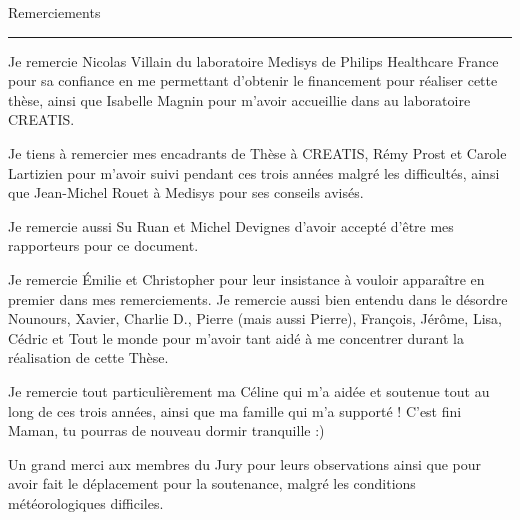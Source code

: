 {\fontsize{30}{100}\selectfont Remerciements}

\rule{15cm}{0.1em}

\vspace{1cm}

\thispagestyle{plain}

Je remercie Nicolas Villain du laboratoire Medisys de Philips Healthcare France pour sa confiance en me permettant d'obtenir le financement pour réaliser cette thèse, ainsi que Isabelle Magnin pour m'avoir accueillie dans au laboratoire CREATIS.

Je tiens à remercier mes encadrants de Thèse à CREATIS, Rémy Prost et Carole Lartizien pour m'avoir suivi pendant ces trois années malgré les difficultés, ainsi que Jean-Michel Rouet à Medisys pour ses conseils avisés.

Je remercie aussi Su Ruan et Michel Devignes d'avoir accepté d'être mes rapporteurs pour ce document.

Je remercie \'Emilie et Christopher pour leur insistance à vouloir apparaître en premier dans mes remerciements. Je remercie aussi bien entendu dans le désordre Nounours, Xavier, Charlie D., Pierre (mais aussi Pierre), François, Jérôme, Lisa, Cédric et Tout le monde pour m'avoir tant aidé à me concentrer durant la réalisation de cette Thèse.

Je remercie tout particulièrement ma Céline qui m'a aidée et soutenue tout au long de ces trois années, ainsi que ma famille qui m'a supporté ! C'est fini Maman, tu pourras de nouveau dormir tranquille :)

Un grand merci aux membres du Jury pour leurs observations ainsi que pour avoir fait le déplacement pour la soutenance, malgré les conditions météorologiques difficiles.
